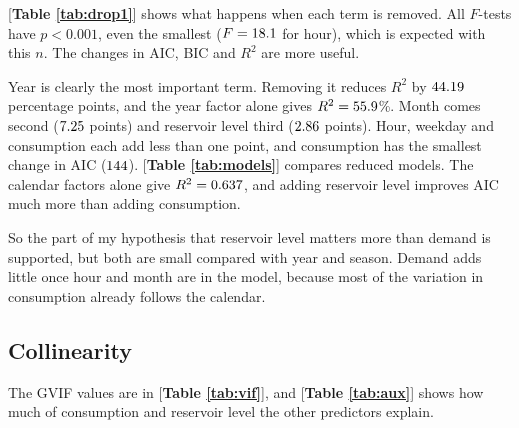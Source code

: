 \documentclass[12pt]{article}
\newcommand{\eur}{EUR/MWh}
\begin{document}
[\textbf{Table \ref{tab:drop1}}] shows what happens when each term is removed. All $F$-tests have $p < 0.001$, even the smallest ($F = 18.1$ for hour), which is expected with this $n$. The changes in AIC, BIC and $R^2$ are more useful.

\begin{table}[!htbp]
\centering
\caption{Drop-one comparison. Each row removes one term from the full model. $\Delta$AIC and $\Delta$BIC are the increase, $\Delta R^2$ the loss in explained variation.}
\label{tab:drop1}
\footnotesize
\setlength{\tabcolsep}{4pt}

\end{table}

Year is clearly the most important term. Removing it reduces $R^2$ by $44.19$ percentage points, and the year factor alone gives $R^2 = 55.9$\%. Month comes second ($7.25$ points) and reservoir level third ($2.86$ points). Hour, weekday and consumption each add less than one point, and consumption has the smallest change in AIC ($144$). [\textbf{Table \ref{tab:models}}] compares reduced models. The calendar factors alone give $R^2 = 0.637$, and adding reservoir level improves AIC much more than adding consumption.

\begin{table}[!htbp]
\centering
\caption{Model comparison. RSE is the residual standard error in \eur. For the GAM the number of parameters is the total effective degrees of freedom.}
\label{tab:models}
\footnotesize

\end{table}

So the part of my hypothesis that reservoir level matters more than demand is supported, but both are small compared with year and season. Demand adds little once hour and month are in the model, because most of the variation in consumption already follows the calendar.

\subsection{Collinearity}

The GVIF values are in [\textbf{Table \ref{tab:vif}}], and [\textbf{Table \ref{tab:aux}}] shows how much of consumption and reservoir level the other predictors explain.

\begin{table}[!htbp]
\centering
\begin{minipage}[t]{0.42\textwidth}
\centering
\caption{Generalized VIF for the full GLM.}
\label{tab:vif}
\footnotesize

\end{minipage}\hfill
\begin{minipage}[t]{0.55\textwidth}
\centering
\caption{$R^2$ (\%) when consumption or reservoir is regressed on other predictors.}
\label{tab:aux}
\footnotesize
\setlength{\tabcolsep}{3pt}

\end{minipage}
\end{table}
\end{document}
